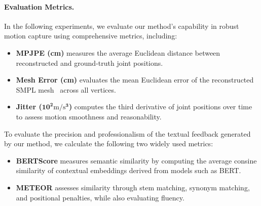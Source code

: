 \vspace{-4mm}
\paragraph{Evaluation Metrics.} 
In the following experiments, we evaluate our method's capability in robust motion capture using comprehensive metrics, including:
\begin{itemize}[leftmargin=*]
    \item \textbf{MPJPE (cm)} measures the average Euclidean distance between reconstructed and ground-truth joint positions.
    \item \textbf{Mesh Error (cm)} evaluates the mean Euclidean error of the reconstructed SMPL mesh~\cite{SMPL2015} across all vertices.
    \item \textbf{Jitter ($\bm{10^2}\textrm{m/s}\bm{^3}$)} computes the third derivative of joint positions over time to assess motion smoothness and reasonability.
\end{itemize}

To evaluate the precision and professionalism of the textual feedback generated by our method, we calculate the following two widely used metrics:
\begin{itemize}[leftmargin=*]
    \item \textbf{BERTScore} measures semantic similarity by computing the average consine similarity of contextual embeddings derived from models such as BERT.
    \item \textbf{METEOR} assesses similarity through stem matching, synonym matching, and positional penalties, while also evaluating fluency.
\end{itemize}


